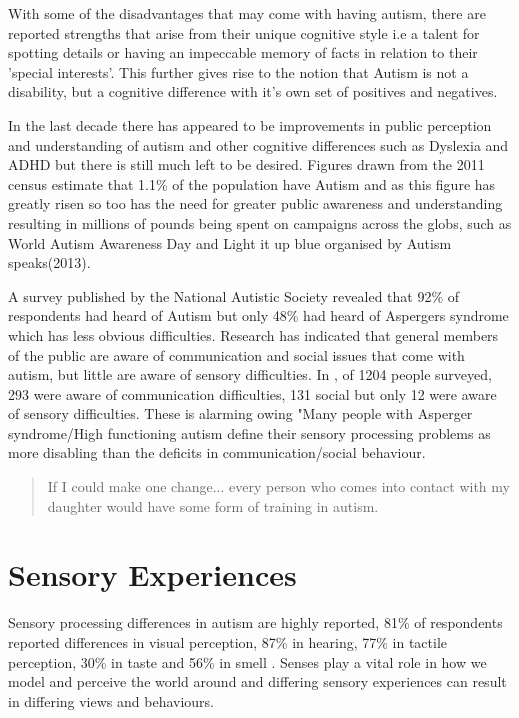\documentclass[11pt]{report}
\begin{document}
With some of the disadvantages that may come with having autism, there are reported strengths that arise from their unique cognitive style i.e a talent for spotting details\cite{bayes} or having an impeccable memory of facts in relation to their 'special interests'. This further gives rise to the notion that Autism is not a disability, but a cognitive difference with it's own set of positives and negatives. 

In the last decade there has appeared to be improvements in public perception and understanding of autism and other cognitive differences such as Dyslexia and ADHD but there is still much left to be desired. Figures drawn from the 2011 census estimate that 1.1\% of the population have Autism\cite{nas} and as this figure has greatly risen\cite{increasingprevalence} so too has the need for greater public awareness and understanding\cite{autism_awareness} resulting in millions of pounds being spent on campaigns across the globs, such as World Autism Awareness Day and Light it up blue organised by Autism speaks(2013)\cite{autism_awareness}. 

A survey published by the National Autistic Society revealed that 92\% of respondents had heard of Autism but only 48\% had heard of Aspergers syndrome which has less obvious difficulties. Research has indicated that general members of the public are aware of communication and social issues that come with autism\cite{autismmisconception}, but little are aware of sensory difficulties\cite{autism_awareness}. In \cite{autism_awareness}, of 1204 people surveyed, 293 were aware of communication difficulties, 131 social but only 12 were aware of sensory difficulties. These is alarming owing "Many people with Asperger syndrome/High functioning autism define their sensory processing problems as more disabling than the deficits in communication/social behaviour\cite{olgab}.

\begin{quote}
If I could make one change... every person who comes into contact with my daughter would have some form of training in autism.\cite{nasschool}
\end{quote}

\section{Sensory Experiences}
Sensory processing differences in autism are highly reported, 81\% of respondents reported differences in visual perception, 87\% in hearing, 77\% in tactile perception, 30\% in taste and 56\% in smell \cite{sensory_leisure}. Senses play a vital role in how we model and perceive the world around and differing sensory experiences can result in differing views and behaviours.
 
\end{document}

